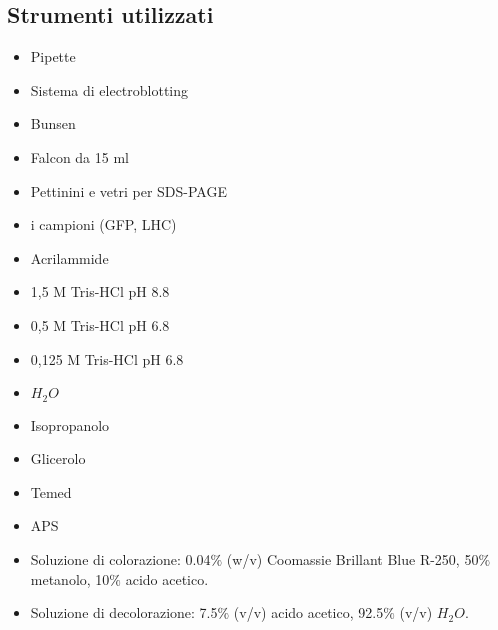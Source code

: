 \documentclass{extarticle}
\begin{document}
\subsection*{Strumenti utilizzati}
\begin{minipage}[c]{0.5\textwidth}
    \begin{itemize}
        \item Pipette
        \item Sistema di electroblotting
        \item Bunsen
        \item Falcon da 15 ml
        \item Pettinini e vetri per SDS-PAGE
        \item i campioni (GFP, LHC)
        \item Acrilammide
        \item 1,5 M Tris-HCl pH 8.8
        \item 0,5 M Tris-HCl pH 6.8
        \item 0,125 M Tris-HCl pH 6.8
    \end{itemize}
\end{minipage} \hfill
\begin{minipage}[c]{0.5\textwidth}
    \begin{itemize}
        \item $H_{2}O$
        \item Isopropanolo
        \item Glicerolo
        \item Temed
        \item APS
        \item Soluzione di colorazione: 0.04$\%$ (w/v) Coomassie Brillant Blue R-250, 50$\%$ metanolo, 10$\%$ acido acetico.
        \item Soluzione di decolorazione: 7.5$\%$ (v/v) acido acetico, 92.5$\%$ (v/v) $H_{2}O$.
    \end{itemize}
\end{minipage}
\end{document}
